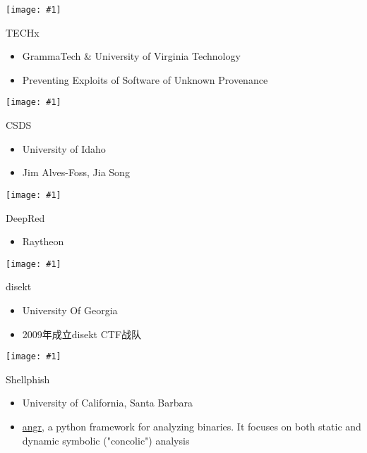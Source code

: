 \documentclass{beamer}
\newcommand{\image}[1]{
  \begin{frame}
    \texttt{[image: \#1]}
  \end{frame}
}
\begin{document}
\image{img/forallsecure.jpg}

\begin{frame}
  \begin{block}{TECHx}
    \begin{itemize}
      \item GrammaTech \& University of Virginia Technology
      \item Preventing Exploits of Software of Unknown Provenance
    \end{itemize}
  \end{block}
\end{frame}

\image{img/techx.jpg}

\begin{frame}
  \begin{block}{CSDS}
    \begin{itemize}
      \item University of Idaho
      \item Jim Alves-Foss, Jia Song
    \end{itemize}
  \end{block}
\end{frame}

\image{img/csds.jpg}

\begin{frame}
  \begin{block}{DeepRed}
    \begin{itemize}
      \item Raytheon
    \end{itemize}
  \end{block}
\end{frame}

\image{img/deepred.jpg}

\begin{frame}
  \begin{block}{disekt}
    \begin{itemize}
      \item University Of Georgia
      \item 2009年成立disekt CTF战队
    \end{itemize}
  \end{block}
\end{frame}

\image{img/disekt.jpg}

\begin{frame}
  \begin{block}{Shellphish}
    \begin{itemize}
      \item University of California, Santa Barbara
      \item \href{http://angr.io}{angr}, a python framework for analyzing binaries. It focuses on both static and dynamic symbolic ("concolic") analysis
    \end{itemize}
  \end{block}
\end{frame}
\end{document}
